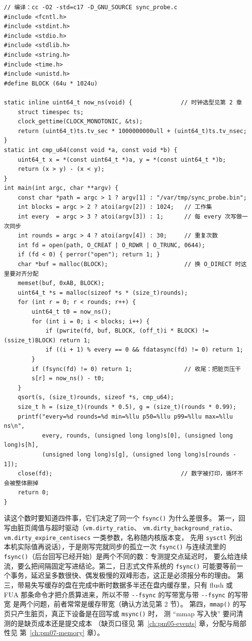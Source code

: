 \documentclass[12pt,a4paper,fontset=fandol]{ctexbook}
\newcommand{\Fn}[1]{\texttt{#1()}}
\newcommand{\Tp}[1]{\texttt{#1}}
\newcommand{\Opt}[1]{\texttt{-\/-#1}}
\newcommand{\Bk}{\discretionary{}{}{}}
\begin{document}
\begin{lstlisting}[style=cstyle,caption={自测提交点延迟的骨架：测出来的是这台机器在这种脏页速率下的数（不含任何预期数值）},label={lst:pm08-fsync}]
// 编译：cc -O2 -std=c17 -D_GNU_SOURCE sync_probe.c
#include <fcntl.h>
#include <stdint.h>
#include <stdio.h>
#include <stdlib.h>
#include <string.h>
#include <time.h>
#include <unistd.h>
#define BLOCK (64u * 1024u)

static inline uint64_t now_ns(void) {              // 时钟选型见第 2 章
    struct timespec ts;
    clock_gettime(CLOCK_MONOTONIC, &ts);
    return (uint64_t)ts.tv_sec * 1000000000ull + (uint64_t)ts.tv_nsec;
}
static int cmp_u64(const void *a, const void *b) {
    uint64_t x = *(const uint64_t *)a, y = *(const uint64_t *)b;
    return (x > y) - (x < y);
}
int main(int argc, char **argv) {
    const char *path = argc > 1 ? argv[1] : "/var/tmp/sync_probe.bin";
    int blocks = argc > 2 ? atoi(argv[2]) : 1024;   // 工作集
    int every  = argc > 3 ? atoi(argv[3]) : 1;      // 每 every 次写做一次同步
    int rounds = argc > 4 ? atoi(argv[4]) : 30;     // 重复次数
    int fd = open(path, O_CREAT | O_RDWR | O_TRUNC, 0644);
    if (fd < 0) { perror("open"); return 1; }
    char *buf = malloc(BLOCK);                      // 换 O_DIRECT 时这里要对齐分配
    memset(buf, 0xAB, BLOCK);
    uint64_t *s = malloc(sizeof *s * (size_t)rounds);
    for (int r = 0; r < rounds; r++) {
        uint64_t t0 = now_ns();
        for (int i = 0; i < blocks; i++) {
            if (pwrite(fd, buf, BLOCK, (off_t)i * BLOCK) != (ssize_t)BLOCK) return 1;
            if ((i + 1) % every == 0 && fdatasync(fd) != 0) return 1;
        }
        if (fsync(fd) != 0) return 1;               // 收尾：把脏页压干
        s[r] = now_ns() - t0;
    }
    qsort(s, (size_t)rounds, sizeof *s, cmp_u64);
    size_t h = (size_t)(rounds * 0.5), g = (size_t)(rounds * 0.99);
    printf("every=%d rounds=%d min=%llu p50=%llu p99=%llu max=%llu ns\n",
           every, rounds, (unsigned long long)s[0], (unsigned long long)s[h],
           (unsigned long long)s[g], (unsigned long long)s[rounds - 1]);
    close(fd);                                     // 数字被打印，循环不会被整体删掉
    return 0;
}
\end{lstlisting}

读这个数时要知道四件事，它们决定了同一个 \Fn{fsync} 为什么差很多。
第一，回写由脏页阈值与超时驱动（\Tp{vm{\Bk}.dirty{\Bk}\_ratio}、
\Tp{vm{\Bk}.dirty{\Bk}\_background{\Bk}\_ratio}、
\Tp{vm{\Bk}.dirty{\Bk}\_expire{\Bk}\_centisecs} 一类参数，名称随内核版本变，
先用 \Tp{sysctl} 列出本机实际值再说话），于是刚写完就同步的孤立一次 \Fn{fsync}
与连续流里的 \Fn{fsync}（后台回写已经开始）是两个不同的数：专测提交点延迟时，
要么给连续流，要么把间隔固定写进结论。第二，日志式文件系统的 \Fn{fsync}
可能要等前一个事务，延迟呈多数很快、偶发极慢的双峰形态，这正是必须报分布的理由。
第三，带易失写缓存的盘在完成中断时数据多半还在盘内缓存里，只有 flush 或 FUA
那条命令才把介质算进来，所以不带 \Opt{fsync} 的写带宽与带 \Opt{fsync} 的写带宽
是两个问题，前者常常是缓存带宽（确认方法见第 2 节）。
第四，\Fn{mmap} 的写页只产生脏页，真正下设备是在回写或 \Fn{msync} 时，
测 ``mmap 写入快'' 要问清测的是缺页成本还是提交成本
（缺页口径见 第~\ref{ch:pm05-events} 章，分配与局部性见 第~\ref{ch:pm07-memory} 章）。
\end{document}

